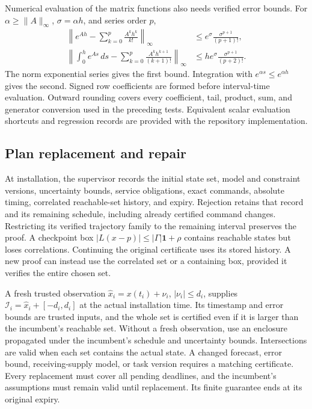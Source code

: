\documentclass[preprint,12pt]{elsarticle}
\begin{document}
Numerical evaluation of the matrix functions also needs verified error
bounds. For $\alpha\ge\|A\|_\infty$, $\sigma=\alpha h$, and series order $p$,
\begin{equation}
 \begin{aligned}
 \left\|e^{Ah}-\sum_{k=0}^p\frac{A^kh^k}{k!}\right\|_\infty
       &\le e^\sigma\frac{\sigma^{p+1}}{(p+1)!},\\
 \left\|\int_0^h e^{As}\,ds-
          \sum_{k=0}^p\frac{A^kh^{k+1}}{(k+1)!}\right\|_\infty
       &\le he^\sigma\frac{\sigma^{p+1}}{(p+2)!}.
 \end{aligned}
 \label{eq:structure-matrix-tails}
\end{equation}
The norm exponential series gives the first bound. Integration with
$e^{\alpha s}\le e^{\alpha h}$ gives the second. Signed row coefficients
are formed before interval-time evaluation. Outward rounding covers every
coefficient, tail, product, sum, and generator conversion used in the
preceding tests. Equivalent scalar evaluation shortcuts and regression
records are provided with the repository implementation.

\subsection{Plan replacement and repair}
\label{sec:new-execution}

At installation, the supervisor records the initial state set, model and
constraint versions, uncertainty bounds, service obligations, exact
commands, absolute timing, correlated reachable-set history, and expiry.
Rejection retains that record and its remaining schedule, including
already certified command changes. Restricting its verified trajectory
family to the remaining interval preserves the proof. A checkpoint box
$|L(x-p)|\le|\Gamma|\mathbf1+\rho$ contains reachable states but loses
correlations. Continuing the original certificate uses its stored history.
A new proof can instead use the correlated set or a containing box,
provided it verifies the entire chosen set.

A fresh trusted observation
$\widehat x_i=x(t_i)+\nu_i$, $|\nu_i|\le d_i$, supplies
$\mathcal I_i=\widehat x_i+[-d_i,d_i]$ at the actual installation time.
Its timestamp and error bounds are trusted inputs, and the whole set is
certified even if it is larger than the incumbent's reachable set. Without
a fresh observation, use an enclosure propagated under the incumbent's
schedule and uncertainty bounds. Intersections are valid when each set
contains the actual state. A changed forecast, error bound, receiving-supply
model, or task version requires a matching certificate. Every replacement
must cover all pending deadlines, and the incumbent's assumptions must
remain valid until replacement. Its finite guarantee ends at its original
expiry.
\end{document}
